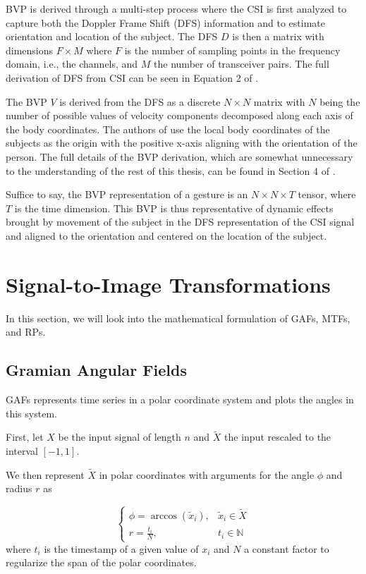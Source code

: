 BVP is derived through a multi-step process where the CSI is first analyzed to capture both the Doppler Frame Shift (DFS) information and to estimate orientation and location of the subject.
The DFS $D$ is then a matrix with dimensions $F \times M$ where $F$ is the number of sampling points in the frequency domain, i.e., the channels, and $M$ the number of transceiver pairs.
The full derivation of DFS from CSI can be seen in Equation 2 of \cite{zheng2019zero}.

The BVP $V$ is derived from the DFS as a discrete $N \times N$ matrix with $N$ being the number of possible values of velocity components decomposed along each axis of the body coordinates.
The authors of \cite{zheng2019zero} use the local body coordinates of the subjects as the origin with the positive x-axis aligning with the orientation of the person.
The full details of the BVP derivation, which are somewhat unnecessary to the understanding of the rest of this thesis, can be found in Section 4 of \cite{zheng2019zero}.

Suffice to say, the BVP representation of a gesture is an $N \times N \times T$ tensor, where $T$ is the time dimension.
This BVP is thus representative of dynamic effects brought by movement of the subject in the DFS representation of the CSI signal and aligned to the orientation and centered on the location of the subject.

\section{Signal-to-Image Transformations}\label{sec:background-signal-to-image}

In this section, we will look into the mathematical formulation of GAFs, MTFs, and RPs.

\subsection{Gramian Angular Fields}

GAFs \cite{wang2015imaging} represents time series in a polar coordinate system and plots the angles in this system.

First, let $X$ be the input signal of length $n$ and $\tilde{X}$ the input rescaled to the interval $[-1, 1]$.

We then represent $\tilde{X}$ in polar coordinates with arguments for the angle $\phi$ and radius $r$ as

\begin{equation}
	\begin{cases}
		\phi = \arccos(\tilde{x}_i), & \tilde{x}_i \in \tilde{X} \\
		r = \frac{t_i}{N}, & t_{i} \in \mathbb{N}
	\end{cases}
\end{equation}
where $t_{i}$ is the timestamp of a given value of $x_i$ and $N$ a constant factor to regularize the span of the polar coordinates.

